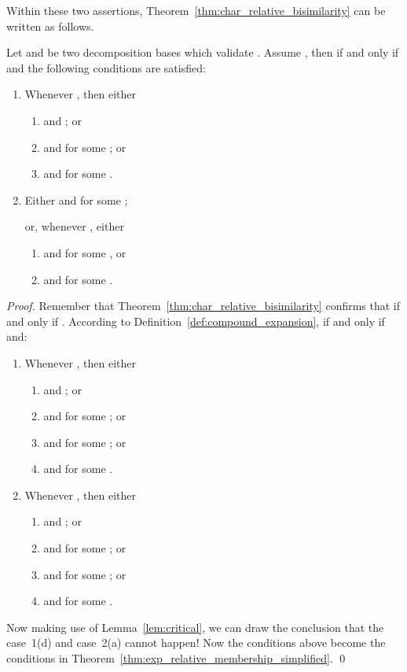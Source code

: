 \documentclass{llncs}
\begin{document}
Within these two assertions, Theorem~\ref{thm:char_relative_bisimilarity} can be written as follows.

\begin{theorem}\label{thm:exp_relative_membership_simplified}
Let  and  be two decomposition bases  which validate  .    Assume
, then   if and only if  and the following conditions are satisfied:
\begin{enumerate}
\item
Whenever , then either
\begin{enumerate}
\item
 and  ; or

\item
 and  for some ; or

\item
 and  for some .
\end{enumerate}

\item
Either  and  for some ;

or, whenever , either
\begin{enumerate}
\item
  and  for some , or

\item
 and  for some .
\end{enumerate}
\end{enumerate}
\end{theorem}

\begin{proof}
Remember that Theorem~\ref{thm:char_relative_bisimilarity} confirms that  if and only if  .  According to Definition~\ref{def:compound_expansion},
 if and only if  and:
\begin{enumerate}
\item
Whenever , then either
 \begin{enumerate}
 \item
   and ; or

  \item
   and   for some ; or

 \item
   and   for some ; or

  \item
   and   for some .
\end{enumerate}

\item
Whenever  , then either
 \begin{enumerate}
 \item
     and ; or

 \item
   and   for some ; or

 \item
   and   for some ; or

  \item
   and   for some .
   \end{enumerate}
\end{enumerate}
Now making use of Lemma~\ref{lem:critical}, we can draw the conclusion that the case~1(d) and case~2(a) cannot happen! Now the conditions above become the conditions in Theorem~\ref{thm:exp_relative_membership_simplified}. \qed
\end{proof}
\end{document}
